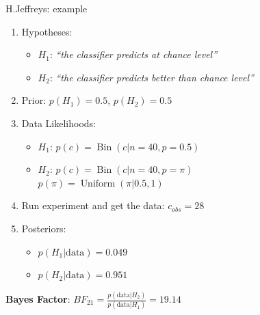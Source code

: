 \documentclass[aspectratio=169]{beamer}
\newcommand{\Bin}{\operatorname{{\mathrm Bin}}}
\newcommand{\Uniform}{\operatorname{{\mathrm Uniform}}}
\begin{document}
\begin{frame}{H.Jeffreys: example}
  \begin{enumerate}
  \item Hypotheses:
    \begin{itemize}
    \item $H_1$: \emph{``the classifier predicts at chance level''}
    \item $H_2$: \emph{``the classifier predicts better than chance
        level''}
    \end{itemize}
  \item Prior: $p(H_1) = 0.5$, $p(H_2) = 0.5$
  \item Data Likelihoods:
    \begin{itemize}
    \item $H_1$: $p(c) = \Bin(c | n=40, p=0.5)$
    \item $H_2$: $p(c) = \Bin(c | n=40, p=\pi)$\\
      \quad \enskip $p(\pi) = \Uniform(\pi | 0.5, 1)$      
    \end{itemize}
  \item Run experiment and get the data: $c_{obs}=28$
  \item Posteriors: 
    \begin{itemize}
    \item $p(H_1|\text{data}) = 0.049$
    \item $p(H_2|\text{data}) = 0.951$
    \end{itemize}
  \end{enumerate}
  \textbf{Bayes Factor}: $BF_{21} = \frac{p(\text{data}|H_2)}{p(\text{data}|H_1)} = 19.14$
\end{frame}
\end{document}
